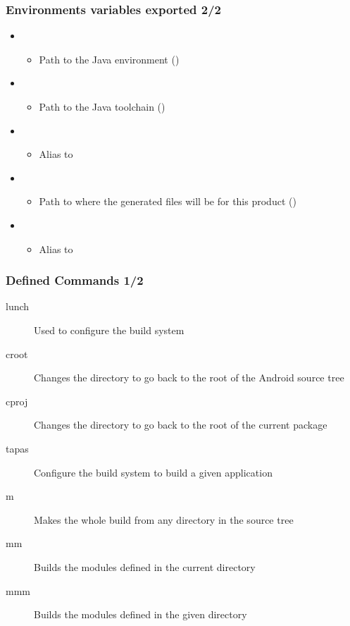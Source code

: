 \begin{frame}
  \frametitle{Environments variables exported 2/2}
  \begin{itemize}
  \item {}
    \begin{itemize}
    \item Path to the Java environment
      ()
    \end{itemize}
  \item {}
    \begin{itemize}
    \item Path to the Java toolchain ()
    \end{itemize}
  \item {}
    \begin{itemize}
    \item Alias to 
    \end{itemize}
  \item {}
    \begin{itemize}
    \item Path to where the generated files will be for this product
      ()
    \end{itemize}
  \item {}
    \begin{itemize}
      \item Alias to 
    \end{itemize}
  \end{itemize}
\end{frame}

\begin{frame}
  \frametitle{Defined Commands 1/2}
  \begin{description}
  \item[lunch] Used to configure the build system
  \item[croot] Changes the directory to go back to the root of the
    Android source tree
  \item[cproj] Changes the directory to go back to the root of the
    current package
  \item[tapas] Configure the build system to build a given application
  \item[m] Makes the whole build from any directory in the source tree
  \item[mm] Builds the modules defined in the current directory
  \item[mmm] Builds the modules defined in the given directory
  \end{description}
\end{frame}

